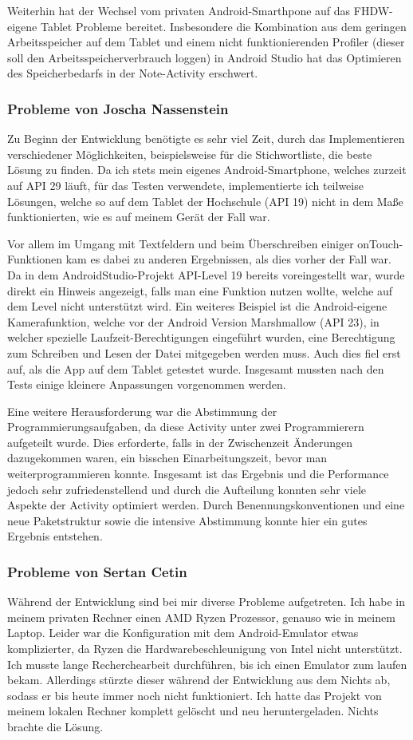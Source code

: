 Weiterhin hat der Wechsel vom privaten Android-Smarthpone auf das FHDW-eigene Tablet Probleme bereitet. Insbesondere die Kombination aus dem geringen Arbeitsspeicher auf dem Tablet und einem nicht funktionierenden Profiler (dieser soll den Arbeitsspeicherverbrauch loggen) in Android Studio hat das Optimieren des Speicherbedarfs in der Note-Activity erschwert.

\subsubsection{Probleme von Joscha Nassenstein}
Zu Beginn der Entwicklung benötigte es sehr viel Zeit, durch das Implementieren verschiedener Möglichkeiten, beispielsweise für die Stichwortliste, die beste Lösung zu finden. Da ich stets mein eigenes Android-Smartphone, welches zurzeit auf API 29 läuft, für das Testen verwendete, implementierte ich teilweise Lösungen, welche so auf dem Tablet der Hochschule (API 19) nicht in dem Maße funktionierten, wie es auf meinem Gerät der Fall war.

Vor allem im Umgang mit Textfeldern und beim Überschreiben einiger onTouch-Funktionen kam es dabei zu anderen Ergebnissen, als dies vorher der Fall war. Da in dem AndroidStudio-Projekt API-Level 19 bereits voreingestellt war, wurde direkt ein Hinweis angezeigt, falls man eine Funktion nutzen wollte, welche auf dem Level nicht unterstützt wird. Ein weiteres Beispiel ist die Android-eigene Kamerafunktion, welche vor der Android Version Marshmallow (API 23), in welcher spezielle Laufzeit-Berechtigungen eingeführt wurden, eine Berechtigung zum Schreiben und Lesen der Datei mitgegeben werden muss. Auch dies fiel erst auf, als die App auf dem Tablet getestet wurde. Insgesamt mussten nach den Tests einige kleinere Anpassungen vorgenommen werden.

Eine weitere Herausforderung war die Abstimmung der Programmierungsaufgaben, da diese Activity unter zwei Programmierern aufgeteilt wurde. Dies erforderte, falls in der Zwischenzeit Änderungen dazugekommen waren, ein bisschen Einarbeitungszeit, bevor man weiterprogrammieren konnte. Insgesamt ist das Ergebnis und die Performance jedoch sehr zufriedenstellend und durch die Aufteilung konnten sehr viele Aspekte der Activity optimiert werden. Durch Benennungskonventionen und eine neue Paketstruktur sowie die intensive Abstimmung konnte hier ein gutes Ergebnis entstehen.

\subsubsection{Probleme von Sertan Cetin}
Während der Entwicklung sind bei mir diverse Probleme aufgetreten. Ich habe in meinem privaten Rechner einen AMD Ryzen Prozessor, genauso wie in meinem Laptop. Leider war die Konfiguration mit dem Android-Emulator etwas komplizierter, da Ryzen die Hardwarebeschleunigung von Intel nicht unterstützt. Ich musste lange Recherchearbeit durchführen, bis ich einen Emulator zum laufen bekam. Allerdings stürzte dieser während der Entwicklung aus dem Nichts ab, sodass er bis heute immer noch nicht funktioniert. Ich hatte das Projekt von meinem lokalen Rechner komplett gelöscht und neu heruntergeladen. Nichts brachte die Lösung.

